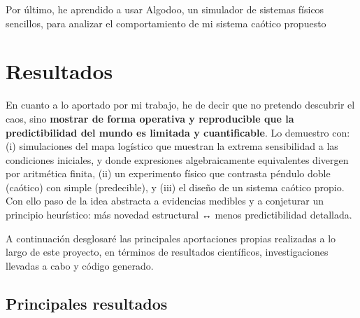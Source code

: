 \documentclass[
  10pt,
  a4paper,
  DIV=11,
  numbers=noendperiod,
  open=any]{scrreprt}
\numberwithin{equation}{chapter}
\numberwithin{equation}{section}
\renewcommand{\[}{\begin{equation}}
\renewcommand{\]}{\end{equation}}
\begin{document}
Por último, he aprendido a usar Algodoo, un simulador de sistemas
físicos sencillos, para analizar el comportamiento de mi sistema caótico
propuesto

\chapter{Resultados}\label{resultados}

En cuanto a lo aportado por mi trabajo, he de decir que no pretendo
descubrir el caos, sino \textbf{mostrar de forma operativa y
reproducible que la predictibilidad del mundo es limitada y
cuantificable}. Lo demuestro con: (i) simulaciones del mapa logístico
que muestran la extrema sensibilidad a las condiciones iniciales, y
donde expresiones algebraicamente equivalentes divergen por aritmética
finita, (ii) un experimento físico que contrasta péndulo doble (caótico)
con simple (predecible), y (iii) el diseño de un sistema caótico propio. Con ello paso de la idea
abstracta a evidencias medibles y a conjeturar un principio heurístico:
más novedad estructural ↔ menos predictibilidad detallada.

A continuación desglosaré las principales aportaciones propias
realizadas a lo largo de este proyecto, en términos de resultados
científicos, investigaciones llevadas a cabo y código generado.

\section{Principales resultados}\label{principales-resultados}
\end{document}
